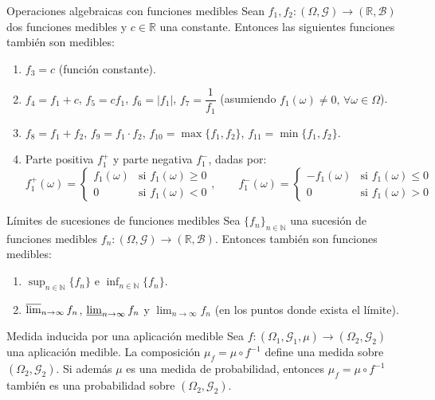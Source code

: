 \begin{proposicion}{Operaciones algebraicas con funciones medibles}
Sean $f_1, f_2 : (\Omega, \mathcal{G}) \to (\mathbb{R}, \mathcal{B})$ dos funciones medibles y $c \in \mathbb{R}$ una constante. Entonces las siguientes funciones también son medibles:
\begin{enumerate}[label=\alph*)]
    \item $f_3 = c$ (función constante).
    \item $f_4 = f_1 + c$, \quad $f_5 = c f_1$, \quad $f_6 = |f_1|$, \quad $f_7 = \dfrac{1}{f_1}$ (asumiendo $f_1(\omega) \neq 0, \, \forall \omega \in \Omega$).
    \item $f_8 = f_1 + f_2$, \quad $f_9 = f_1 \cdot f_2$, \quad $f_{10} = \max\{f_1, f_2\}$, \quad $f_{11} = \min\{f_1, f_2\}$.
    \item Parte positiva $f_1^+$ y parte negativa $f_1^-$, dadas por:
    \[
        f_1^+(\omega) = \begin{cases} f_1(\omega) & \text{si } f_1(\omega) \ge 0 \\ 0 & \text{si } f_1(\omega) < 0 \end{cases}, \qquad f_1^-(\omega) = \begin{cases} -f_1(\omega) & \text{si } f_1(\omega) \le 0 \\ 0 & \text{si } f_1(\omega) > 0 \end{cases}
    \]
\end{enumerate}
\end{proposicion}

\begin{proposicion}{Límites de sucesiones de funciones medibles}
Sea $\{f_n\}_{n \in \mathbb{N}}$ una sucesión de funciones medibles $f_n : (\Omega, \mathcal{G}) \to (\mathbb{R}, \mathcal{B})$. Entonces también son funciones medibles:
\begin{enumerate}[label=\alph*)]
    \item $\sup_{n \in \mathbb{N}} \{f_n\}$ e $\inf_{n \in \mathbb{N}} \{f_n\}$.
    \item $\varlimsup_{n \to \infty} f_n$, \quad $\varliminf_{n \to \infty} f_n$ \quad y \quad $\lim_{n \to \infty} f_n$ (en los puntos donde exista el límite).
\end{enumerate}
\end{proposicion}

\begin{teorema}{Medida inducida por una aplicación medible}
Sea $f : (\Omega_1, \mathcal{G}_1, \mu) \to (\Omega_2, \mathcal{G}_2)$ una aplicación medible. La composición $\mu_f = \mu \circ f^{-1}$ define una medida sobre $(\Omega_2, \mathcal{G}_2)$. Si además $\mu$ es una medida de probabilidad, entonces $\mu_f = \mu \circ f^{-1}$ también es una probabilidad sobre $(\Omega_2, \mathcal{G}_2)$.
\end{teorema}

